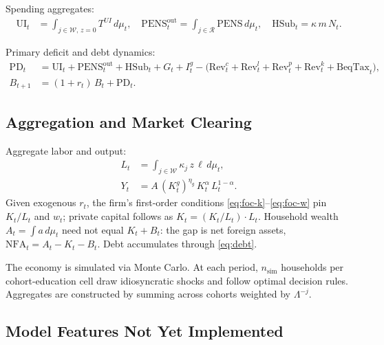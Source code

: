 Spending aggregates:
\begin{align*}
\text{UI}_t &= \int_{j\in\mathcal{W},\,z=0} T^{UI}\,d\mu_t, \quad
\text{PENS}_t^{\text{out}} = \int_{j\in\mathcal{R}} \text{PENS}\,d\mu_t, \quad
\text{HSub}_t = \kappa\,m\,N_t.
\end{align*}

Primary deficit and debt dynamics:
\begin{align}
\text{PD}_t &= \text{UI}_t + \text{PENS}_t^{\text{out}} + \text{HSub}_t + G_t + I_t^g - \bigl(\text{Rev}_t^c + \text{Rev}_t^l + \text{Rev}_t^p + \text{Rev}_t^k + \text{BeqTax}_t\bigr), \label{eq:primary-deficit}\\
B_{t+1} &= (1+r_t)\,B_t + \text{PD}_t. \label{eq:debt}
\end{align}

\subsection{Aggregation and Market Clearing}
Aggregate labor and output:
\begin{align*}
L_t &= \int_{j\in\mathcal{W}} \kappa_j\,z\,\ell\,d\mu_t, \\
Y_t &= A\,(K_t^g)^{\eta_g}\,K_t^\alpha\,L_t^{1-\alpha}.
\end{align*}
Given exogenous $r_t$, the firm's first-order conditions \eqref{eq:foc-k}--\eqref{eq:foc-w} pin $K_t/L_t$ and $w_t$; private capital follows as $K_t = (K_t/L_t)\cdot L_t$. Household wealth $A_t = \int a\,d\mu_t$ need not equal $K_t + B_t$: the gap is net foreign assets, $\text{NFA}_t = A_t - K_t - B_t$. Debt accumulates through \eqref{eq:debt}.

The economy is simulated via Monte Carlo. At each period, $n_{\text{sim}}$ households per cohort-education cell draw idiosyncratic shocks and follow optimal decision rules. Aggregates are constructed by summing across cohorts weighted by $\Lambda^{-j}$.

\subsection{Model Features Not Yet Implemented}\label{sec:not-implemented}

